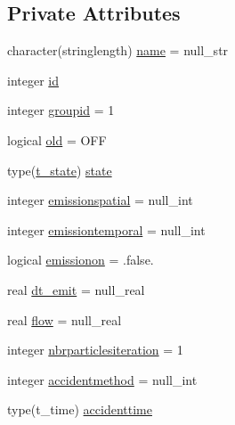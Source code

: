 \subsection*{Private Attributes}
\begin{DoxyCompactItemize}
\item 
character(stringlength) \mbox{\hyperlink{structmodulelagrangianglobal_1_1t__origin_a14fc883f79cf1c9c4114d4e3917971b3}{name}} = null\+\_\+str
\item 
integer \mbox{\hyperlink{structmodulelagrangianglobal_1_1t__origin_a5b17795fba01b5ce1d6e6b9b4e945f0e}{id}}
\item 
integer \mbox{\hyperlink{structmodulelagrangianglobal_1_1t__origin_ab94fd7ccca06ffb11e1f7df7a9f7d463}{groupid}} = 1
\item 
logical \mbox{\hyperlink{structmodulelagrangianglobal_1_1t__origin_ad4654f3f95e1267366e6ca52b16ed461}{old}} = O\+FF
\item 
type(\mbox{\hyperlink{structmodulelagrangianglobal_1_1t__state}{t\+\_\+state}}) \mbox{\hyperlink{structmodulelagrangianglobal_1_1t__origin_a01f7c85574241892910f973876d86650}{state}}
\item 
integer \mbox{\hyperlink{structmodulelagrangianglobal_1_1t__origin_a118331ed3f7c2db7efe1e16daf5f89b0}{emissionspatial}} = null\+\_\+int
\item 
integer \mbox{\hyperlink{structmodulelagrangianglobal_1_1t__origin_a26591a4ce9afeb1fa39364bea6236420}{emissiontemporal}} = null\+\_\+int
\item 
logical \mbox{\hyperlink{structmodulelagrangianglobal_1_1t__origin_a7d5fff26c7e9d3703776fddbbf09b253}{emissionon}} = .false.
\item 
real \mbox{\hyperlink{structmodulelagrangianglobal_1_1t__origin_a7d0066f4c47b341535b2cab1753b3f84}{dt\+\_\+emit}} = null\+\_\+real
\item 
real \mbox{\hyperlink{structmodulelagrangianglobal_1_1t__origin_af0f4ad0f3d92ad794d7fcf1733c45e18}{flow}} = null\+\_\+real
\item 
integer \mbox{\hyperlink{structmodulelagrangianglobal_1_1t__origin_a99a5f8ccc22a59ae993cffa068431a22}{nbrparticlesiteration}} = 1
\item 
integer \mbox{\hyperlink{structmodulelagrangianglobal_1_1t__origin_a570cd866ffe95759efbd361f1cd3283c}{accidentmethod}} = null\+\_\+int
\item 
type(t\+\_\+time) \mbox{\hyperlink{structmodulelagrangianglobal_1_1t__origin_a4a8a13b7b45ae487b6eb897368d98e30}{accidenttime}}
\item 

\end{DoxyCompactItemize}
